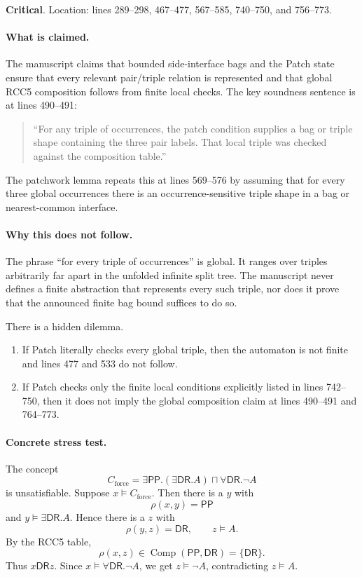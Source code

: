 \documentclass[11pt]{article}
\newcommand{\PP}{\mathsf{PP}}
\newcommand{\DR}{\mathsf{DR}}
\newcommand{\Comp}{\operatorname{Comp}}
\newcommand{\Critical}{\textbf{\textcolor{crit}{Critical}}}
\begin{document}
\noindent\Critical.  Location: lines 289--298, 467--477, 567--585, 740--750, and 756--773.

\paragraph{What is claimed.}
The manuscript claims that bounded side-interface bags and the \textsf{Patch} state ensure that every relevant pair/triple relation is represented and that global RCC5 composition follows from finite local checks.  The key soundness sentence is at lines 490--491:
\begin{quote}
``For any triple of occurrences, the patch condition supplies a bag or triple shape containing the three pair labels.  That local triple was checked against the composition table.''
\end{quote}
The patchwork lemma repeats this at lines 569--576 by assuming that for every three global occurrences there is an occurrence-sensitive triple shape in a bag or nearest-common interface.

\paragraph{Why this does not follow.}
The phrase ``for every triple of occurrences'' is global.  It ranges over triples arbitrarily far apart in the unfolded infinite split tree.  The manuscript never defines a finite abstraction that represents every such triple, nor does it prove that the announced finite bag bound suffices to do so.

There is a hidden dilemma.
\begin{enumerate}[label=(\alph*)]
\item If \textsf{Patch} literally checks every global triple, then the automaton is not finite and lines 477 and 533 do not follow.
\item If \textsf{Patch} checks only the finite local conditions explicitly listed in lines 742--750, then it does not imply the global composition claim at lines 490--491 and 764--773.
\end{enumerate}

\paragraph{Concrete stress test.}
The concept
\[
C_{\mathrm{force}} = \exists\PP.(\exists\DR.A) \sqcap \forall\DR.\neg A
\]
is unsatisfiable.  Suppose $x\models C_{\mathrm{force}}$.  Then there is a $y$ with
\[
  \rho(x,y)=\PP
\]
and $y\models\exists\DR.A$.  Hence there is a $z$ with
\[
  \rho(y,z)=\DR, \qquad z\models A.
\]
By the RCC5 table,
\[
  \rho(x,z)\in\Comp(\PP,\DR)=\{\DR\}.
\]
Thus $x\DR z$.  Since $x\models\forall\DR.\neg A$, we get $z\models\neg A$, contradicting $z\models A$.
\end{document}
